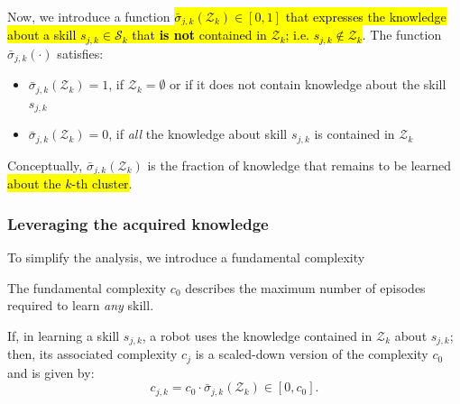 Now, we introduce a function \hl{$\bar{\sigma}_{j,k}(\mathcal{Z}_k)\in [0,1]$ that expresses the knowledge about a skill $s_{j,k} \in \mathcal{S}_k$ that \textbf{is not} contained in $\mathcal{Z}_k$; i.e. $s_{j,k} \notin \mathcal{Z}_k$}. The function $\bar{\sigma}_{j,k}(\cdot)$ satisfies:
\begin{itemize}
	\item $\bar{\sigma}_{j,k}(\mathcal{Z}_k) = 1$, if $\mathcal{Z}_k=\emptyset$ or if it does not contain knowledge about the skill $s_{j,k}$
	\item $\bar{\sigma}_{j,k}(\mathcal{Z}_k) = 0$, if \emph{all} the knowledge about skill $s_{j,k}$ is contained in $\mathcal{Z}_k$
\end{itemize} 
Conceptually, $\bar{\sigma}_ {j,k}(\mathcal{Z}_k)$ is the fraction of knowledge that remains to be learned \hl{about the $k$-th cluster}.
\subsubsection{\textbf{Leveraging the acquired knowledge}}
To simplify the analysis, we introduce a fundamental complexity
\begin{tcolorbox}
\begin{assumption}\label{assumption:fundamental_complexity} The fundamental complexity $c_0$ describes the maximum number of episodes required to learn \emph{any} skill.
\end{assumption}
\end{tcolorbox}
If, in learning a skill $ s_{j,k} $, a robot uses the knowledge contained in $\mathcal{Z}_k$ about $s_{j,k}$; then, its associated complexity $ c_j $ is a scaled-down version of the complexity $c_{0}$ and is given by:
\begin{equation}\label{eq:scaled_complexity}
c_{j,k} = c_{0} \cdot \bar{\sigma}_{j,k}\left(\mathcal{Z}_k\right)\in [0, c_{0}].
\end{equation}

